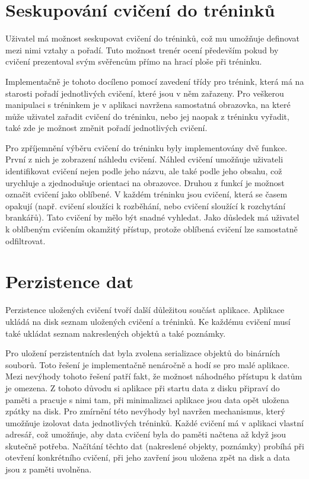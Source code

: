 \documentclass[thesis=B,czech]{FITthesis}[2012/06/26]
\begin{document}
	\section{Seskupování cvičení do tréninků}

	Uživatel má možnost seskupovat cvičení do tréninků, což mu umožňuje definovat mezi nimi vztahy a pořadí. Tuto možnost trenér ocení především pokud by cvičení prezentoval svým svěřencům přímo na hrací ploše při tréninku.

	Implementačně je tohoto docíleno pomocí zavedení třídy pro trénink, která má na starosti pořadí jednotlivých cvičení, které jsou v něm zařazeny. Pro veškerou manipulaci s tréninkem je v aplikaci navržena samostatná obrazovka, na které může uživatel zařadit cvičení do tréninku, nebo jej naopak z tréninku vyřadit, také zde je možnost změnit pořadí jednotlivých cvičení.

	Pro zpříjemnění výběru cvičení do tréninku byly implementovány dvě funkce. První z nich je zobrazení náhledu cvičení. Náhled cvičení umožňuje uživateli identifikovat cvičení nejen podle jeho názvu, ale také podle jeho obsahu, což urychluje a zjednodušuje orientaci na obrazovce. Druhou z funkcí je možnost označit cvičení jako oblíbené. V každém tréninku jsou cvičení, která se časem opakují (např. cvičení sloužíci k rozběhání, nebo cvičení sloužící k rozchytání brankářů). Tato cvičení by mělo být snadné vyhledat. Jako důsledek má uživatel k oblíbeným cvičením okamžitý přístup, protože oblíbená cvičení lze samostatně odfiltrovat.

	\section{Perzistence dat}

	Perzistence uložených cvičení tvoří další důležitou součást aplikace. Aplikace ukládá na disk seznam uložených cvičení a tréninků. Ke každému cvičení musí také ukládat seznam nakreslených objektů a také poznámky.

	Pro uložení perzistentních dat byla zvolena serializace objektů do binárních souborů. Toto řešení je implementačně nenáročně a hodí se pro malé aplikace. Mezi nevýhody tohoto řešení patří fakt, že možnost náhodného přístupu k datům je omezena. Z tohoto důvodu si aplikace při startu data z disku připraví do paměti a pracuje s nimi tam, při minimalizaci aplikace jsou data opět uložena zpátky na disk. Pro zmírnění této nevýhody byl navržen mechanismus, který umožňuje izolovat data jednotlivých tréninků. Každé cvičení má v aplikaci vlastní adresář, což umožňuje, aby data cvičení byla do paměti načtena až když jsou skutečně potřeba. Načítání těchto dat (nakreslené objekty, poznámky) probíhá při otevření konkrétního cvičení, při jeho zavření jsou uložena zpět na disk a data jsou z paměti uvolněna.
\end{document}
